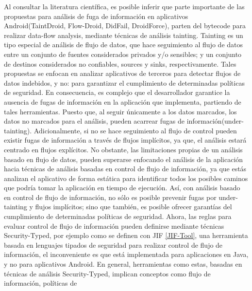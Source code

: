 Al consultar la literatura científica, es posible inferir que parte importante
de las propuestas para análisis de fuga de información en aplicativos
Android(TaintDroid\cite{TaintDroid}, Flow-Droid\cite{FlowDroid-Thesis},
DidFail\cite{DidFail}, DroidForce\cite{DroidForce}), parten del bytecode para
realizar data-flow analysis, mediante técnicas de análisis tainting. Tainting
es un tipo especial de análisis de flujo de datos, que hace seguimiento al flujo
de datos entre un conjunto de fuentes considerados privados y/o sensibles; y un
conjunto de destinos considerados no confiables, sources y sinks,
respectivamente.\newline 
Tales propuestas se enfocan en analizar aplicativos de terceros para detectar
flujos de datos indebidos, y no: para garantizar el cumplimiento de determinadas
políticas de seguridad. En consecuencia, es complejo que el desarrollador
garantice la ausencia de fugas de información en la aplicación que implementa,
partiendo de tales herramientas. Puesto que, al seguir únicamente a los datos
marcados, los datos no marcados para el análisis, pueden acarrear fugas de
información(under-tainting). Adicionalmente, si no se hace seguimiento al flujo
de control pueden existir fugas de información a través de flujos implícitos,
ya que, el análisis estará centrado en flujos explícitos.\newline
No obstante, las limitaciones propias de un análisis basado en flujo de datos,
pueden superarse enfocando el análisis de la aplicación hacia técnicas de
análisis basadas en control de flujo de información, ya que estás analizan el
aplicativo de forma estática para identificar todos los posibles caminos que
podría tomar la aplicación en tiempo de ejecución. Así, con análisis basado en
control de flujo de información, no sólo es posible prevenir fugas por
under-tainting y flujos implícitos; sino que también, es posible ofrecer
garantías del cumplimiento de determinadas políticas de seguridad.\newline 
Ahora, las reglas para evaluar control de flujo de información pueden definirse
mediante técnicas Security-Typed, por ejemplo como se definen con
JIF \ref{JIF-Tool}, una herramienta basada en lenguajes tipados de seguridad
para realizar control de flujo de información, el inconveniente es que está
implementada para aplicaciones en Java, y no para aplicativos Android.\newline 
En general, herramientas como estas, basadas en técnicas de análisis
Security-Typed, implican conceptos como flujo de información, políticas de
